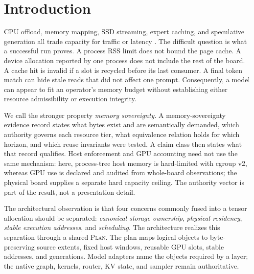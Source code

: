 \documentclass[letterpaper,twocolumn,10pt]{article}
\newcommand{\Plan}{\textsc{Plan}\xspace}
\begin{document}
\section{Introduction}
\label{sec:intro}

CPU offload, memory mapping, SSD streaming, expert caching, and speculative
generation all trade capacity for traffic or latency
\cite{flexgen,deepspeedinference,deepnvme,llminflash,moeinfinity,flexinfer,specoffload}.
The difficult question is what a successful run proves.  A process RSS limit
does not bound the page cache.  A device allocation reported by one process
does not include the rest of the board.  A cache hit is invalid if a slot is
recycled before its last consumer.  A final token match can hide stale reads
that did not affect one prompt.  Consequently, a model can appear to fit an
operator's memory budget without establishing either resource admissibility or
execution integrity.

We call the stronger property \emph{memory sovereignty}.  A memory-sovereignty
evidence record states what bytes exist and are semantically demanded, which
authority governs each resource tier, what equivalence relation holds for which
horizon, and which reuse invariants were tested.  A claim class then states what
that record qualifies.  Host enforcement and GPU accounting need not use the
same mechanism: here, process-tree host memory is hard-limited with cgroup v2,
whereas GPU use is declared and audited from whole-board observations; the
physical board supplies a separate hard capacity ceiling.  The authority vector
is part of the result, not a presentation detail.

The architectural observation is that four concerns commonly fused into a
tensor allocation should be separated: \emph{canonical storage ownership},
\emph{physical residency}, \emph{stable execution addresses}, and
\emph{scheduling}.  The architecture realizes this separation through a shared \Plan.
The plan maps logical objects to byte-preserving source extents, fixed host
windows, reusable GPU slots, stable addresses, and generations.  Model adapters
name the objects required by a layer; the native graph, kernels, router, KV
state, and sampler remain authoritative.
\end{document}
